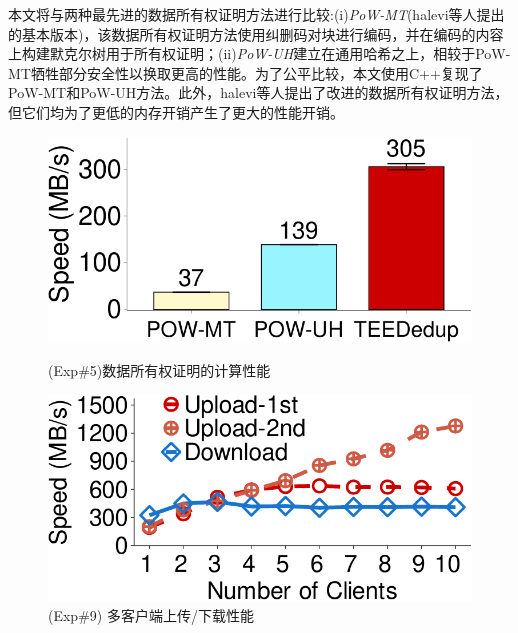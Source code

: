 本文将\sysnameS 与两种最先进的数据所有权证明方法进行比较:(i)\textit{PoW-MT}\cite{halevi11}(halevi等人提出的基本版本)，该数据所有权证明方法使用纠删码对块进行编码，并在编码的内容上构建默克尔树用于所有权证明；(ii)\textit{PoW-UH}\cite{xu2013weak}建立在通用哈希之上，相较于PoW-MT牺牲部分安全性以换取更高的性能。为了公平比较，本文使用C++复现了PoW-MT和PoW-UH方法。此外，halevi等人\cite{halevi11}提出了改进的数据所有权证明方法，但它们均为了更低的内存开销产生了更大的性能开销。

\begin{figure}[!htb]
    \begin{minipage}[t]{0.47\textwidth}
        \centering
        \includegraphics[width=\linewidth]{pic/sgxdedup/expa4_powPerformance.pdf}
        \caption{\small(Exp\#5)数据所有权证明的计算性能}
        \label{fig:sgxdedup-pow-comparison}
    \end{minipage}%
    \hspace{0.2in}
    \begin{minipage}[t]{0.47\textwidth}
        \centering
        \includegraphics[width=\linewidth]{pic/sgxdedup/expb1_multiple_client.pdf}
        \caption{(Exp\#9) 多客户端上传/下载性能}
        \label{fig:sgxdedup-multiClientThroughput}
    \end{minipage}%
\end{figure}

